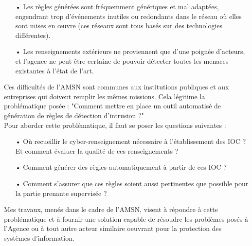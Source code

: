 \begin{itemize}[itemsep=0.75em]
    \item[•] Les règles générées sont fréquemment génériques et mal adaptées, engendrant trop d'événements inutiles ou redondants dans le réseau où elles sont mises en œuvre (ces réseaux sont tous basés sur des technologies différentes).
    \item[•] Les renseignements extérieurs ne proviennent que d'une poignée d'acteurs, et l'agence ne peut être certaine de pouvoir détecter toutes les menaces existantes à l'état de l'art.\\
\end{itemize}

\newpage

Ces difficultés de l'AMSN sont communes aux institutions publiques et aux entreprises qui doivent remplir les mêmes missions. Cela légitime la problématique posée : "Comment mettre en place un outil automatisé de génération de règles de détection d’intrusion ?"\\

Pour aborder cette problématique, il faut se poser les questions suivantes :
\vspace{0.5em}
\begin{itemize}[itemsep=0.5em]
    \item[•] Où recueillir le cyber-renseignement nécessaire à l'établissement des IOC ? Et comment évaluer la qualité de ces renseignements ?
    \item[•] Comment générer des règles automatiquement à partir de ces IOC ?
    \item[•] Comment s'assurer que ces règles soient aussi pertinentes que possible pour la partie prenante supervisée ?\\
\end{itemize}

Mes travaux, menés dans le cadre de l'AMSN, visent à répondre à cette problématique et à fournir une solution capable de résoudre les problèmes posés à l'Agence ou à tout autre acteur similaire oeuvrant pour la protection des systèmes d'information.
